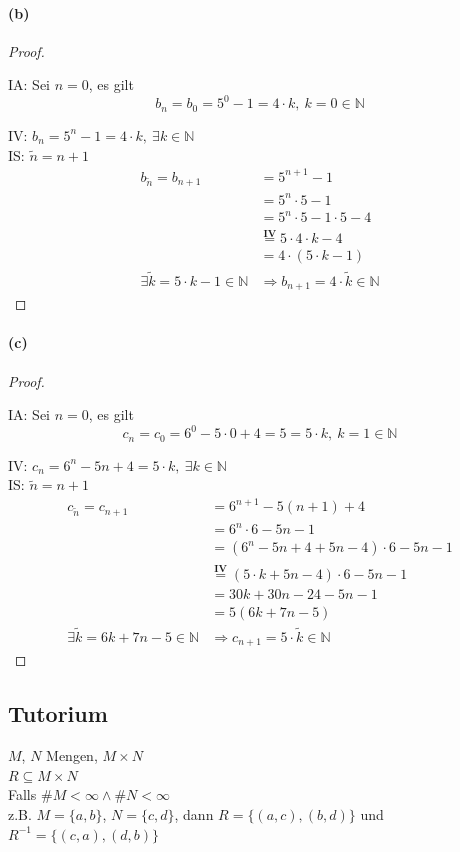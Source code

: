 \newpage

\paragraph{(b)}
\begin{proof}
$ $\newline

IA: Sei $n=0$, es gilt
\begin{equation*}
b_n=b_0=5^0-1=4\cdot k,\ k=0\in\mathbb{N}
\end{equation*}

IV: $b_n=5^n-1=4\cdot k,\ \exists k\in\mathbb{N}$\\

IS: $\tilde{n}=n+1$
\begin{align*}
b_{\tilde{n}}=b_{n+1}
&=5^{n+1}-1\\
&=5^n\cdot 5-1\\
&=5^n\cdot 5-1\cdot 5-4\\
&\overset{\mathbf{IV}}{=}5\cdot 4\cdot k-4\\
&=4\cdot(5\cdot k-1)\\
\exists\tilde{k}=5\cdot k-1\in\mathbb{N}&\Rightarrow b_{n+1}=4\cdot\tilde{k}\in\mathbb{N}
\end{align*}
\end{proof}

\paragraph{(c)}
\begin{proof}
$ $\newline

IA: Sei $n=0$, es gilt
\begin{equation*}
c_n=c_0=6^0-5\cdot 0+4=5=5\cdot k,\ k=1\in\mathbb{N}
\end{equation*}

IV: $c_n=6^n-5n+4=5\cdot k,\ \exists k\in\mathbb{N}$\\

IS: $\tilde{n}=n+1$
\begin{align*}
c_{\tilde{n}}=c_{n+1}
&=6^{n+1}-5(n+1)+4\\
&=6^n\cdot 6-5n-1\\
&=(6^n-5n+4+5n-4)\cdot 6-5n-1\\
&\overset{\mathbf{IV}}{=}(5\cdot k+5n-4)\cdot 6-5n-1\\
&=30k+30n-24-5n-1\\
&=5(6k+7n-5)\\
\exists\tilde{k}=6k+7n-5\in\mathbb{N}&\Rightarrow c_{n+1}=5\cdot\tilde{k}\in\mathbb{N}
\end{align*}
\end{proof}

\newpage

\subsection{Tutorium}

$M$, $N$ Mengen, $M\times N$\\
$R\subseteq M\times N$\\
Falls $\#M<\infty\wedge\#N<\infty$\\
z.B. $M=\{a,b\}$, $N=\{c,d\}$, dann $R=\{(a,c),(b,d)\}$ und $R^{-1}=\{(c,a),(d,b)\}$\\
